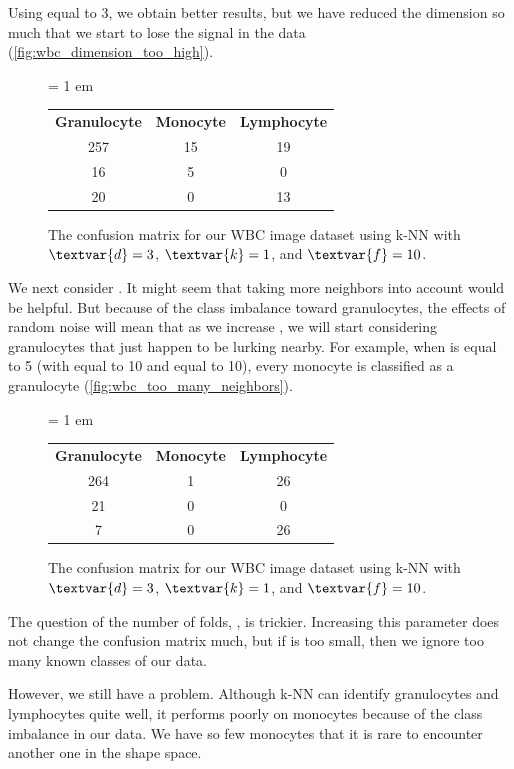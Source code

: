 Using  equal to 3, we obtain better results, but we have reduced the dimension so much that we start to lose the signal in the data (\autoref{fig:wbc_dimension_too_high}).\\

\begin{figure}[h]
\centering
\tabcolsep = 1 em
\mySfFamily
\begin{tabular}{c c c}
\textbf{Granulocyte} & \textbf{Monocyte} & \textbf{Lymphocyte} \\
257 & 15 & 19 \\
16 & 5 & 0 \\
20 & 0 & 13
\end{tabular}
\caption{The confusion matrix for our WBC image dataset using k-NN with $\textvar{d} = \text{3}$, $\textvar{k} = \text{1}$, and $\textvar{f} = \text{10}$.}
\label{fig:wbc_dimension_too_high}
\end{figure}

We next consider . It might seem that taking more neighbors into account would be helpful. But because of the class imbalance toward granulocytes, the effects of random noise will mean that as we increase , we will start considering granulocytes that just happen to be lurking nearby. For example, when  is equal to 5 (with  equal to 10 and  equal to 10), every monocyte is classified as a granulocyte (\autoref{fig:wbc_too_many_neighbors}).\\

\begin{figure}[h]
\centering
\tabcolsep = 1 em
\mySfFamily
\begin{tabular}{c c c}
\textbf{Granulocyte} & \textbf{Monocyte} & \textbf{Lymphocyte} \\
264 & 1 & 26 \\
21 & 0 & 0 \\
7 & 0 & 26
\end{tabular}
\caption{The confusion matrix for our WBC image dataset using k-NN with $\textvar{d} = \text{3}$, $\textvar{k} = \text{1}$, and $\textvar{f} = \text{10}$.}
\label{fig:wbc_too_many_neighbors}
\end{figure}

The question of the number of folds, , is trickier. Increasing this parameter does not change the confusion matrix much, but if  is too small, then we ignore too many known classes of our data.

However, we still have a problem. Although k-NN can identify granulocytes and lymphocytes quite well, it performs poorly on monocytes because of the class imbalance in our data. We have so few monocytes that it is rare to encounter another one in the shape space.


